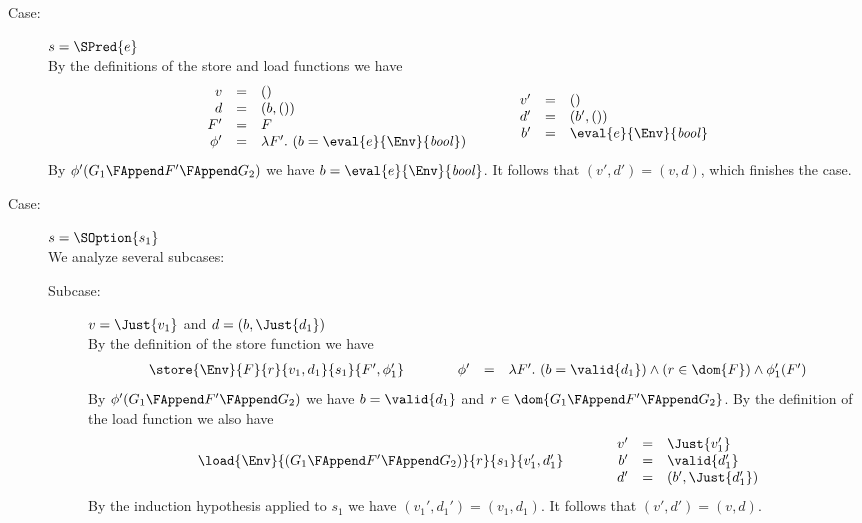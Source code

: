 {\begin{description}
\item[Case:] $s = \SPred{e}$\\[1ex]
%
By the definitions of the store and load functions we have
\[
\begin{array}{rcl}
v &=& ()\\
d &=& (b,())\\
F' &=& F\\
\phi' &=& \lambda F'.~(b = \eval{e}{\Env}{\mathit{bool}})\\
\end{array}\hspace*{1cm}\begin{array}{rcl}
v' &=& ()\\
d' &=& (b',())\\
b' &=& \eval{e}{\Env}{\mathit{bool}}\\
\end{array}
\]
By $\phi'(G_1 \FAppend F' \FAppend G_2)$ we have $b =
\eval{e}{\Env}{\mathit{bool}}$. It follows that $(v',d') = (v,d)$,
which finishes the case. 

\item[Case:] $s = \SOption{s_1}$\\[1ex]
%
We analyze several subcases:
\begin{description}
\item[Subcase:] $v = \Just{v_1}$ and $d = (b,\Just{d_1})$\\[1ex]
%
By the definition of the store function we have
\[
\begin{array}{l}
\store{\Env}{F}{r}{ v_1,d_1 }{s_1}{F',\phi_1'}\\
\end{array}\hspace*{1cm}\begin{array}{rcl}
\phi' &=& \lambda F'.~(b = \valid{d_1}) \wedge (r \in \dom{F}) \wedge \phi_1'(F')\\
\end{array}
\]
%
By $\phi'(G_1 \FAppend F' \FAppend G_2)$ we have $b = \valid{d_1}$ and
$r \in \dom{G_1 \FAppend F' \FAppend G_2}$.  By the definition of the
load function we also have
\[ 
\begin{array}{rcll}
\load{\Env}{(G_1 \FAppend F' \FAppend G_2)}{r}{s_1}{v_1',d_1'}\\
\end{array}\hspace*{1cm}\begin{array}{rcl}
v' &=& \Just{v_1'}\\
b' &=& \valid{d_1'}\\
d' &=& (b',\Just{d_1'})\\
\end{array}
\]
By the induction hypothesis applied to $s_1$ we have $(v_1',d_1') =
(v_1,d_1)$. It follows that $(v',d') = (v,d)$. 


\end{description}
\end{description}}
